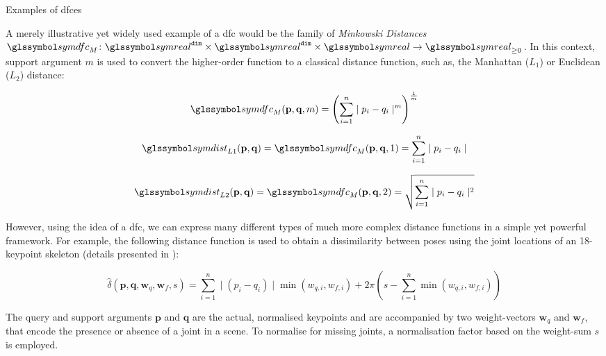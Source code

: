 \begin{example}[label=example:dfc]{Examples of \acrlong{dfc}es}{}

    A merely illustrative yet widely used example of a \acrshort{dfc} would be the family of \emph{Minkowski Distances} $\symdfc_{M} \colon \symreal^{\mathtt{dim}} \times \symreal^{\mathtt{dim}} \times \symreal \to \symreal_{\geq 0}$. In this context, support argument $m$ is used to convert the higher-order function to a classical distance function, such as, the Manhattan ($L_1$) or Euclidean ($L_2$) distance:

    \begin{equation}
        \symdfc_{M}(\mathbf{p},\mathbf{q},m) = \left(\sum_{i=1}^{n} \mid p_i - q_i \mid^m\right)^{\frac{1}{m}}
    \end{equation}
    
    \begin{equation}
       \symdist_{L1}(\mathbf{p},\mathbf{q}) = \symdfc_M(\mathbf{p},\mathbf{q}, 1) = \sum_{i=1}^{n} \mid p_i - q_i \mid
    \end{equation}
    
    \begin{equation}
       \symdist_{L2}(\mathbf{p},\mathbf{q}) =\symdfc_M(\mathbf{p},\mathbf{q}, 2) = \sqrt{\sum_{i=1}^{n} \mid p_i - q_i \mid^2}
    \end{equation}
    
    However, using the idea of a \acrshort{dfc}, we can express many different types of much more complex distance functions in a simple yet powerful framework. For example, the following distance function is used to obtain a dissimilarity between poses using the joint locations of an 18-keypoint skeleton (details presented in \cite{Heller:2022Multi}):

    \begin{equation}
        \hat{\delta}(\mathbf{p},\mathbf{q},\mathbf{w}_q,\mathbf{w}_f, s) = \sum_{i=1}^{n} \mid (p_i - q_i) \mid \min(w_{q,i}, w_{f,i}) + 2\pi (s - \sum_{i=1}^{n} \min(w_{q,i}, w_{f,i}))
    \end{equation}

    The query and support arguments $\mathbf{p}$ and $\mathbf{q}$ are the actual, normalised keypoints and are accompanied by two weight-vectors $\mathbf{w}_q$ and $\mathbf{w}_f$, that encode the presence or absence of a joint in a scene. To normalise for missing joints, a normalisation factor based on the weight-sum $s$ is employed.

\end{example}


